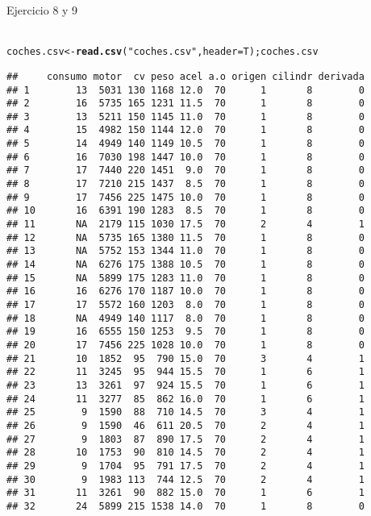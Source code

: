 \documentclass{article}\usepackage[]{graphicx}\usepackage[]{color}
\makeatletter
\newcommand{\hlstr}[1]{\textcolor[rgb]{0.192,0.494,0.8}{#1}}%
\newcommand{\hlstd}[1]{\textcolor[rgb]{0.345,0.345,0.345}{#1}}%
\newcommand{\hlkwb}[1]{\textcolor[rgb]{0.69,0.353,0.396}{#1}}%
\newcommand{\hlkwc}[1]{\textcolor[rgb]{0.333,0.667,0.333}{#1}}%
\newcommand{\hlkwd}[1]{\textcolor[rgb]{0.737,0.353,0.396}{\textbf{#1}}}%
\newenvironment{kframe}{%
 \def\at@end@of@kframe{}%
 \ifinner\ifhmode%
  \def\at@end@of@kframe{\end{minipage}}%
  \begin{minipage}{\columnwidth}%
 \fi\fi%
 \def\FrameCommand##1{\hskip\@totalleftmargin \hskip-\fboxsep
 \colorbox{shadecolor}{##1}\hskip-\fboxsep
     \hskip-\linewidth \hskip-\@totalleftmargin \hskip\columnwidth}%
 \MakeFramed {\advance\hsize-\width
   \@totalleftmargin\z@ \linewidth\hsize
   \@setminipage}}%
 {\par\unskip\endMakeFramed%
 \at@end@of@kframe}
\newenvironment{knitrout}{}{} %
\makeatother
\begin{document}
Ejercicio 8 y 9\\
\\
\begin{knitrout}
\color{fgcolor}\begin{kframe}
\begin{alltt}
\hlstd{coches.csv} \hlkwb{<-} \hlkwd{read.csv}\hlstd{(}\hlstr{"coches.csv"}\hlstd{,} \hlkwc{header} \hlstd{= T); coches.csv}
\end{alltt}
\begin{verbatim}
##     consumo motor  cv peso acel a.o origen cilindr derivada
## 1        13  5031 130 1168 12.0  70      1       8        0
## 2        16  5735 165 1231 11.5  70      1       8        0
## 3        13  5211 150 1145 11.0  70      1       8        0
## 4        15  4982 150 1144 12.0  70      1       8        0
## 5        14  4949 140 1149 10.5  70      1       8        0
## 6        16  7030 198 1447 10.0  70      1       8        0
## 7        17  7440 220 1451  9.0  70      1       8        0
## 8        17  7210 215 1437  8.5  70      1       8        0
## 9        17  7456 225 1475 10.0  70      1       8        0
## 10       16  6391 190 1283  8.5  70      1       8        0
## 11       NA  2179 115 1030 17.5  70      2       4        1
## 12       NA  5735 165 1380 11.5  70      1       8        0
## 13       NA  5752 153 1344 11.0  70      1       8        0
## 14       NA  6276 175 1388 10.5  70      1       8        0
## 15       NA  5899 175 1283 11.0  70      1       8        0
## 16       16  6276 170 1187 10.0  70      1       8        0
## 17       17  5572 160 1203  8.0  70      1       8        0
## 18       NA  4949 140 1117  8.0  70      1       8        0
## 19       16  6555 150 1253  9.5  70      1       8        0
## 20       17  7456 225 1028 10.0  70      1       8        0
## 21       10  1852  95  790 15.0  70      3       4        1
## 22       11  3245  95  944 15.5  70      1       6        1
## 23       13  3261  97  924 15.5  70      1       6        1
## 24       11  3277  85  862 16.0  70      1       6        1
## 25        9  1590  88  710 14.5  70      3       4        1
## 26        9  1590  46  611 20.5  70      2       4        1
## 27        9  1803  87  890 17.5  70      2       4        1
## 28       10  1753  90  810 14.5  70      2       4        1
## 29        9  1704  95  791 17.5  70      2       4        1
## 30        9  1983 113  744 12.5  70      2       4        1
## 31       11  3261  90  882 15.0  70      1       6        1
## 32       24  5899 215 1538 14.0  70      1       8        0

\end{verbatim}
\end{kframe}
\end{knitrout}
\end{document}
